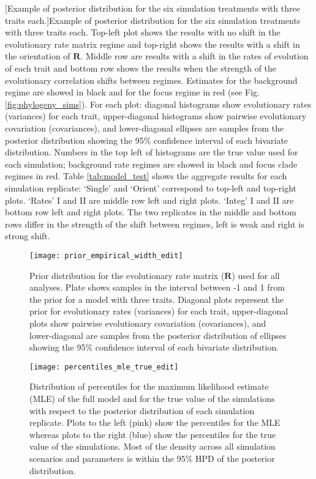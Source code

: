 [Example of posterior distribution for the six simulation treatments with three traits each.]{Example of posterior distribution for the six simulation treatments with three traits each. Top-left plot shows the results with no shift in the evolutionary rate matrix regime and top-right shows the results with a shift in the orientation of $\mathbf{R}$. Middle row are results with a shift in the rates of evolution of each trait and bottom row shows the results when the strength of the evolutionary correlation shifts between regimes. Estimates for the background regime are showed in black and for the focus regime in red (see Fig. \ref{fig:phylogeny_sims}). For each plot: diagonal histograms show evolutionary rates (variances) for each trait, upper-diagonal histograms show pairwise evolutionary covariation (covariances), and lower-diagonal ellipses are samples from the posterior distribution showing the 95\% confidence interval of each bivariate distribution. Numbers in the top left of histograms are the true value used for each simulation; background rate regimes are showed in black and focus clade regimes in red. Table \ref{tab:model_test} shows the aggregate results for each simulation replicate: `Single' and `Orient' correspond to top-left and top-right plots. `Rates' I and II are middle row left and right plots. `Integ' I and II are bottom row left and right plots. The two replicates in the middle and bottom rows differ in the strength of the shift between regimes, left is weak and right is strong shift.}
\label{fig:posterior_sims}

\begin{figure}[h]
	\centering
	\texttt{[image: prior\_empirical\_width\_edit]}
	\caption[Prior distribution for the evolutionary rate matrix ($\mathbf{R}$) used for all analyses.]{Prior distribution for the evolutionary rate matrix ($\mathbf{R}$) used for all analyses. Plate shows samples in the interval between -1 and 1 from the prior for a model with three traits. Diagonal plots represent the prior for evolutionary rates (variances) for each trait, upper-diagonal plots show pairwise evolutionary covariation (covariances), and lower-diagonal are samples from the posterior distribution of ellipses showing the 95\% confidence interval of each bivariate distribution.}
	\label{fig:prior}
\end{figure}

\begin{figure}[h]
	\centering
	\texttt{[image: percentiles\_mle\_true\_edit]}
	\caption[Distribution of percentiles for the maximum likelihood estimate (MLE) of the full model and for the true value of the simulations with respect to the posterior distribution of each simulation replicate.]{Distribution of percentiles for the maximum likelihood estimate (MLE) of the full model and for the true value of the simulations with respect to the posterior distribution of each simulation replicate. Plots to the left (pink) show the percentiles for the MLE whereas plots to the right (blue) show the percentiles for the true value of the simulations. Most of the density across all simulation scenarios and parameters is within the 95\% HPD of the posterior distribution.}
	\label{fig:quantiles}
\end{figure}

